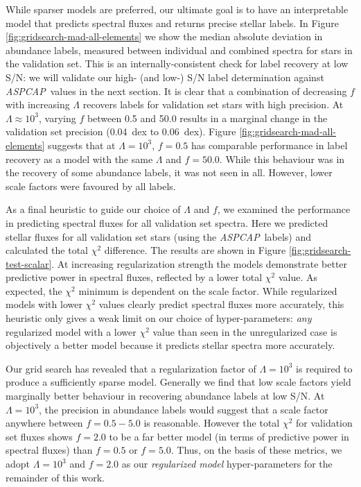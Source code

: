 \documentclass[12pt,preprint]{aastex}
\newcommand{\project}[1]{\textsl{#1}}
\newcommand{\acronym}[1]{{\small{#1}}}
\newcommand{\aspcap}{\project{\acronym{ASPCAP}}}
\begin{document}
While sparser models are preferred, our ultimate goal is to have an 
interpretable model that predicts spectral fluxes and returns precise stellar
labels.  In Figure \ref{fig:gridsearch-mad-all-elements} we show the median
absolute deviation in abundance labels, measured between individual and combined
spectra for stars in the validation set.  This is an internally-consistent
check for label recovery at low S/N: we will validate our high- (and low-) S/N
label determination against \aspcap\ values in the next section.  It is
clear that a combination of decreasing $f$ with increasing $\Lambda$ recovers
labels for validation set stars with high precision.  At $\Lambda \approx 10^3$,
varying $f$ between 0.5 and 50.0 results in a marginal change in the validation
set precision (0.04~dex to 0.06~dex).  Figure \ref{fig:gridsearch-mad-all-elements}
suggests that at $\Lambda = 10^3$, $f = 0.5$ has comparable performance in
label recovery as a model with the same $\Lambda$ and $f = 50.0$.  While this
behaviour was in the recovery of some abundance labels, it was not seen in all.
However, lower scale factors were favoured by all labels.


As a final heuristic to guide our choice of $\Lambda$ and $f$, we examined the
performance in predicting spectral fluxes for all validation set spectra.  Here 
we predicted stellar fluxes for all validation set stars (using the \aspcap\ 
labels) and calculated the total $\chi^2$ difference.  The results are shown in
Figure \ref{fig:gridsearch-test-scalar}.  At increasing regularization strength
the models demonstrate better predictive power in spectral fluxes, reflected by
a lower total $\chi^2$ value.  As expected, the $\chi^2$ minimum is dependent on
the scale factor.  While regularized models with lower $\chi^2$ values clearly
predict spectral fluxes more accurately, this heuristic only gives a weak limit
on our choice of hyper-parameters: \emph{any} regularized model with a lower
$\chi^2$ value than seen in the unregularized case is objectively a better model 
because it predicts stellar spectra more accurately.


Our grid search has revealed that a regularization factor of $\Lambda = 10^3$ is
required to produce a sufficiently sparse model.  Generally we find that low
scale factors yield marginally better behaviour in recovering abundance labels
at low S/N.  At $\Lambda = 10^3$, the precision in abundance labels would 
suggest that a scale factor anywhere between $f = 0.5-5.0$ is reasonable. 
However the total $\chi^2$ for validation set fluxes shows $f = 2.0$ to be a far
better model (in terms of predictive power in spectral fluxes) than $f = 0.5$
or $f = 5.0$.  Thus, on the basis of these metrics, we adopt $\Lambda = 10^3$
and $f = 2.0$ as our \emph{regularized model} hyper-parameters for the
remainder of this work.
\end{document}
